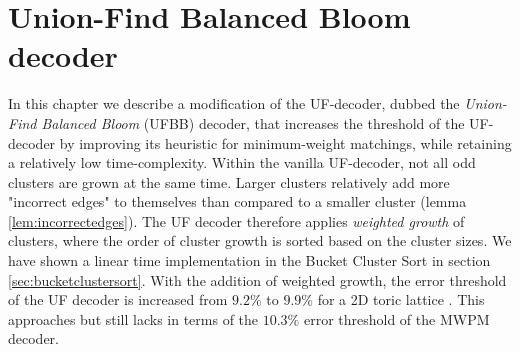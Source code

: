 \chapter{Union-Find Balanced Bloom decoder}


In this chapter we describe a modification of the UF-decoder, dubbed the \emph{Union-Find Balanced Bloom} (UFBB) decoder, that increases the threshold of the UF-decoder by improving its heuristic for minimum-weight matchings, while retaining a relatively low time-complexity. Within the vanilla UF-decoder, not all odd clusters are grown at the same time. Larger clusters relatively add more "incorrect edges" to themselves than compared to a smaller cluster (lemma \ref{lem:incorrectedges}). The UF decoder therefore applies \emph{weighted growth} of clusters, where the order of cluster growth is sorted based on the cluster sizes. We have shown a linear time implementation in the Bucket Cluster Sort in section \ref{sec:bucketclustersort}. With the addition of weighted growth, the error threshold of the UF decoder is increased from $9.2\%$ to $9.9\%$ for a 2D toric lattice \cite{delfosse2017almost}. This approaches but still lacks in terms of the $10.3\%$ error threshold of the MWPM decoder.

